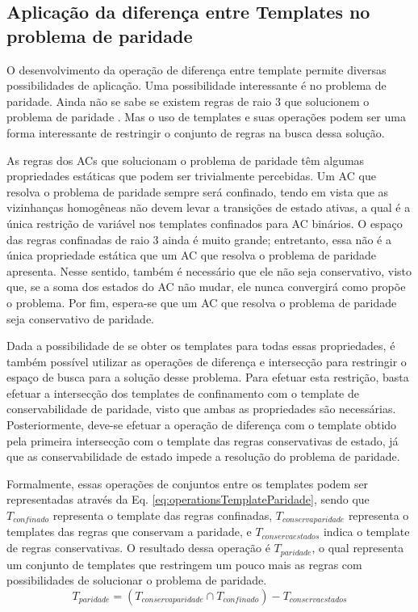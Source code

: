 \subsection{Aplicação da diferença entre Templates no problema de paridade}
O desenvolvimento da operação de diferença entre template permite diversas possibilidades de aplicação.
Uma possibilidade interessante é no problema de paridade. 
Ainda não se sabe se existem regras de raio 3 que solucionem o problema de paridade \cite{Betel2013}. 
Mas o uso de templates e suas operações podem ser uma forma interessante de restringir o conjunto de regras na busca dessa solução.

As regras dos ACs que solucionam o problema de paridade têm algumas propriedades estáticas que podem ser trivialmente percebidas. 
Um AC que resolva o problema de paridade sempre será confinado, tendo em vista que as vizinhanças homogêneas não devem levar a transições de estado ativas, a qual é a única restrição de variável nos templates confinados para AC binários. 
O espaço das regras confinadas de raio 3 ainda é muito grande; entretanto, essa não é a única propriedade estática que um AC que resolva o problema de paridade apresenta.  Nesse sentido, também é necessário que ele não seja conservativo, visto que, se a soma dos estados do AC não mudar, ele nunca convergirá como propõe o problema. 
Por fim, espera-se que um AC que resolva o problema de paridade seja conservativo de paridade.

Dada a possibilidade de se obter os templates para todas essas propriedades, é também possível utilizar as operações de diferença e intersecção para restringir o espaço de busca para a solução desse problema.
Para efetuar esta restrição, basta efetuar a intersecção dos templates de confinamento com o template de conservabilidade de paridade, visto que ambas as propriedades são necessárias. 
Posteriormente, deve-se efetuar a operação de diferença com o template obtido pela primeira intersecção com o template das regras conservativas de estado, já que as conservabilidade de estado impede a resolução do problema de paridade.

Formalmente, essas operações de conjuntos entre os templates podem ser representadas através da Eq. \eqref{eq:operationsTemplateParidade}, sendo que $T_{confinado}$ representa o template das regras confinadas, $T_{conservaparidade}$ representa o templates das regras que conservam a paridade, e ${T}_{conservaestados}$ indica o template de regras conservativas. O resultado dessa operação é $T_{paridade}$, o qual representa um conjunto de templates que restringem um pouco mais as regras com possibilidades de solucionar o problema de paridade.
\begin{equation}
T_{paridade} = (T_{conservaparidade} \cap T_{confinado}) - {T}_{conservaestados}
\label{eq:operationsTemplateParidade}
\end{equation}